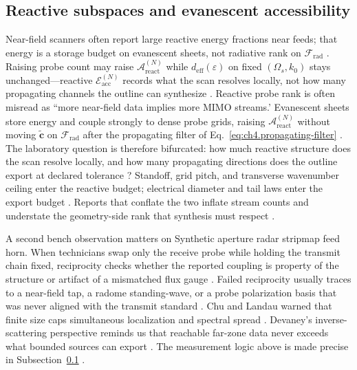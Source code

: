 \subsection{Reactive subspaces and evanescent accessibility}
\label{sec:ch472}
Near-field scanners often report large reactive energy fractions near feeds; that energy is a storage budget on evanescent sheets, not radiative rank on $\mathcal{F}_{\mathrm{rad}}$ \cite{stratton1941}. Raising probe count may raise $\mathcal{A}_{\mathrm{react}}^{(N)}$ while $d_{\mathrm{eff}}(\varepsilon)$ on fixed \((\Omega_s,k_0)\) stays unchanged---reactive $\mathcal{E}_{\mathrm{acc}}^{(N)}$ records what the scan resolves locally, not how many propagating channels the outline can synthesize \cite{hansen1988}.
\medskip
Reactive probe rank is often misread as ``more near-field data implies more MIMO streams.' Evanescent sheets store energy and couple strongly to dense probe grids, raising $\mathcal{A}_{\mathrm{react}}^{(N)}$ without moving $\widetilde{\mathbf{c}}$ on $\mathcal{F}_{\mathrm{rad}}$ after the propagating filter of Eq.~\eqref{eq:ch4.propagating-filter} \cite{stratton1941}. The laboratory question is therefore bifurcated: how much reactive structure does the scan resolve locally, and how many propagating directions does the outline export at declared tolerance \cite{hansen1988}?
Standoff, grid pitch, and transverse wavenumber ceiling enter the reactive budget; electrical diameter and tail laws enter the export budget \cite{jackson1999}. Reports that conflate the two inflate stream counts and understate the geometry-side rank that synthesis must respect \cite{devaney2004}.
\begin{physicalvignette}
A second bench observation matters on Synthetic aperture radar stripmap feed horn. When technicians swap only the receive probe while holding the transmit chain fixed, reciprocity checks whether the reported coupling is property of the structure or artifact of a mismatched flux gauge \cite{stratton1941}. Failed reciprocity usually traces to a near-field tap, a radome standing-wave, or a probe polarization basis that was never aligned with the transmit standard \cite{hansen1988}.
Chu and Landau warned that finite size caps simultaneous localization and spectral spread \cite{chu1948}. Devaney's inverse-scattering perspective reminds us that reachable far-zone data never exceeds what bounded sources can export \cite{devaney2004}.
The measurement logic above is made precise in Subsection~\ref{sec:ch472} \cite{stratton1941}.
\end{physicalvignette}

